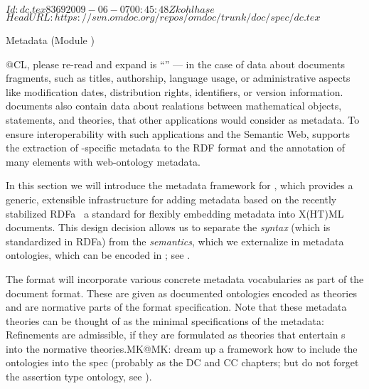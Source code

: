 \svnInfo $Id: dc.tex 8369 2009-06-07 00:45:48Z kohlhase $
\svnKeyword $HeadURL: https://svn.omdoc.org/repos/omdoc/trunk/doc/spec/dc.tex $

\begin{module}[id=genmeta]
\begin{omgroup}[creators={miko,clange},short={Metadata},id=metadatachap]
  {Metadata (Module {})}

\begin{newpart}{@CL, please re-read and expand}
   is ``{}'' --- in the case of
  {\omdoc} data about documents fragments, such as titles, authorship, language usage, or
  administrative aspects like modification dates, distribution rights, identifiers, or
  version information. {\omdoc} documents also contain data about realations between
  mathematical objects, statements, and theories, that other applications would consider
  as metadata. To ensure interoperability with such applications and the Semantic Web,
  {\omdoc} supports the extraction of {\omdoc}-specific metadata to the RDF
  format and the annotation of many {\omdoc} elements with web-ontology
  metadata.

  In this section we will introduce the metadata framework for {},
  which provides a generic, extensible infrastructure for adding metadata based on the
  recently stabilized RDFa~\cite{AdidaEtAl08:RDFa} a standard for flexibly embedding
  metadata into X(HT)ML documents. This design decision allows us to separate the
  {\emph{syntax}} (which is standardized in RDFa) from the {\emph{semantics}}, which we
  externalize in metadata ontologies, which can be encoded in {\omdoc}; see
  {}.



  The {\omdoc} format will incorporate various concrete metadata vocabularies as part of
  the document format. These are given as documented ontologies encoded as {\omdoc}
  theories and are normative parts of the format specification. Note that these metadata
  theories can be
  thought of as the minimal specifications of the metadata: Refinements are admissible, if
  they are formulated as {\omdoc} theories that entertain {}s into the
  normative theories.{MK@MK: dream up a framework how to include the ontologies into the
    spec (probably as the DC and CC chapters; but do not forget the assertion type
    ontology, see ).}


\end{newpart}
\end{omgroup}
\end{module}
